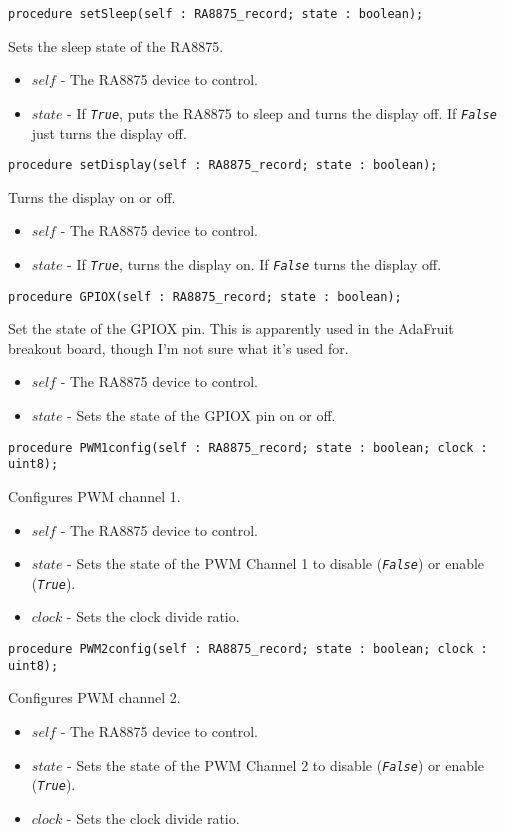 \documentclass[10pt, openany]{book}
\newcommand{\constant}[1]{\emph{\texttt{#1}}}
\begin{document}
\begin{lstlisting}
procedure setSleep(self : RA8875_record; state : boolean);
\end{lstlisting}
Sets the sleep state of the RA8875.
\begin{itemize}
  \item $self$ - The RA8875 device to control.
  \item $state$ - If \constant{True}, puts the RA8875 to sleep and turns the display off.  If \constant{False} just turns the display off.
\end{itemize}

\begin{lstlisting}
procedure setDisplay(self : RA8875_record; state : boolean);
\end{lstlisting}
Turns the display on or off.
\begin{itemize}
  \item $self$ - The RA8875 device to control.
  \item $state$ - If \constant{True}, turns the display on.  If \constant{False} turns the display off.
\end{itemize}

\begin{lstlisting}
procedure GPIOX(self : RA8875_record; state : boolean);
\end{lstlisting}
Set the state of the GPIOX pin.  This is apparently used in the AdaFruit breakout board, though I'm not sure what it's used for.
\begin{itemize}
  \item $self$ - The RA8875 device to control.
  \item $state$ - Sets the state of the GPIOX pin on or off.
\end{itemize}

\begin{lstlisting}
procedure PWM1config(self : RA8875_record; state : boolean; clock : uint8);
\end{lstlisting}
Configures PWM channel 1.
\begin{itemize}
  \item $self$ - The RA8875 device to control.
  \item $state$ - Sets the state of the PWM Channel 1 to disable (\constant{False}) or enable (\constant{True}).
  \item $clock$ - Sets the clock divide ratio.
\end{itemize}

\begin{lstlisting}
procedure PWM2config(self : RA8875_record; state : boolean; clock : uint8);
\end{lstlisting}
Configures PWM channel 2.
\begin{itemize}
  \item $self$ - The RA8875 device to control.
  \item $state$ - Sets the state of the PWM Channel 2 to disable (\constant{False}) or enable (\constant{True}).
  \item $clock$ - Sets the clock divide ratio.
\end{itemize}
\end{document}
